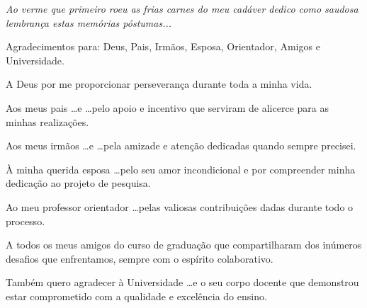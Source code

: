 \documentclass[
    a4paper,        %
    12pt,           %
    oneside,        %
    openright,      %
    final,          %
    sumario=tradicional, %
    english,        %
    french,         %
    spanish,        %
    brazil          %
    ]{abntex2}
\begin{document}
\begin{dedicatoria}
    \vspace*{\fill}
    \hspace{3.9cm}
    \begin{minipage}{10.5cm}
        \noindent
        \emph{Ao verme que primeiro roeu as frias carnes do meu cadáver dedico como saudosa lembrança estas memórias póstumas...}
    \end{minipage}
    \vspace*{1cm}
\end{dedicatoria}



\begin{agradecimentos}
    Agradecimentos para: Deus, Pais, Irmãos, Esposa, Orientador, Amigos e Universidade.

    A Deus por me proporcionar perseverança durante toda a minha vida.

    Aos meus pais \ldots e \ldots pelo apoio e incentivo que serviram de alicerce para as minhas realizações.

    Aos meus irmãos \ldots e \ldots pela amizade e atenção dedicadas quando sempre precisei.

    À minha querida esposa \ldots pelo seu amor incondicional e por compreender minha dedicação ao projeto de pesquisa.

    Ao meu professor orientador \ldots pelas valiosas contribuições dadas durante todo o processo.

    A todos os meus amigos do curso de graduação que compartilharam dos inúmeros desafios que enfrentamos, sempre com o espírito colaborativo.

    Também quero agradecer à Universidade \ldots e o seu corpo docente que demonstrou estar comprometido com a qualidade e excelência do ensino.
\end{agradecimentos}
\end{document}
